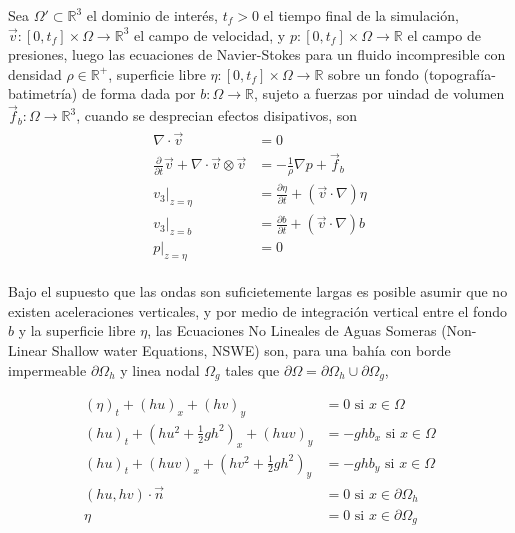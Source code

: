 Sea  $\Omega' \subset \mathbb{R}^3$ el dominio de inter\'es, $t_f>0$ el tiempo final de la simulaci\'on,   $\vec v : [0,t_f]\times \Omega \rightarrow  \mathbb{R}^3$ el campo de velocidad, y $p : [0,t_f] \times \Omega \rightarrow \mathbb{R}$ el campo de presiones, luego las ecuaciones de Navier-Stokes para un fluido incompresible con densidad $\rho \in \mathbb{R}^+$, superficie libre  $\eta: [0,t_f] \times \Omega \rightarrow \mathbb{R}$ sobre un fondo (topograf\'ia-batimetr\'ia) de forma dada por $b:\Omega \rightarrow \mathbb{R}$, sujeto a fuerzas por uindad de volumen $\vec f_b : \Omega \rightarrow \mathbb{R}^3$,  cuando se desprecian efectos disipativos, son \cite{toro}
\begin{align}
  \begin{split}
    \nabla \cdot \vec v &= 0 \\
    \frac{\partial }{\partial t}\vec v + \nabla \cdot \vec v \otimes \vec v  &= -\frac{1}{\rho}\nabla p + \vec f_b    \\
    v_3|_{z=\eta	} &= \frac{\partial \eta}{\partial t}+(\vec v \cdot \nabla )\eta \\
    v_3|_{z=b} &= \frac{\partial b}{\partial t} + (\vec v \cdot \nabla )b \\    
    p|_{z = \eta} &= 0
  \end{split}  
  \label{NS-incompresible}
\end{align}

Bajo el supuesto que las ondas son suficietemente largas es posible asumir que no existen aceleraciones verticales, y por medio de integraci\'on vertical entre el fondo $b$ y la superficie libre $\eta$, las Ecuaciones No Lineales de Aguas Someras (Non-Linear Shallow water Equations, NSWE) son, para una bah\'ia con borde impermeable $\partial\Omega_h$ y linea nodal $\Omega_g$ tales que $\partial \Omega = \partial \Omega_h \cup \partial \Omega_g$,

\begin{equation}  \begin{split}
\left(\eta\right)_{t}+\left(hu\right)_{x}+\left(hv\right)_{y} & =0  \text{       si } x \in \Omega\\
  \left(hu\right)_{t}+(hu^{2}+\frac{1}{2}gh^{2})_{x}+(huv)_{y} & =-ghb_{x}  \text{   si } x\in\Omega\\
  \left(hu\right)_{t}+(huv)_{x}+(hv^{2}+\frac{1}{2}gh^{2})_{y} & =-ghb_{y}  \text{     si } x \in \Omega\\
  (hu,hv) \cdot \vec n &= 0  \text{ si    } x\in\partial \Omega_h \\
   \eta &= 0  \text{ si    } x \in \partial \Omega_g  
  \end{split}
  \label{eq:nswe_cart}
  \end{equation}

